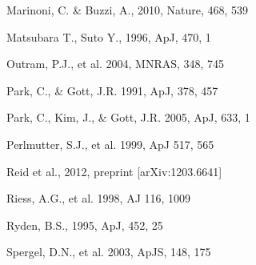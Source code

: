 \documentclass{emulateapj}
\begin{document}
\begin{thebibliography}{}
Marinoni, C. \& Buzzi, A., 2010, Nature, 468, 539

Matsubara T., Suto Y., 1996, ApJ, 470, 1

Outram, P.J., et al. 2004, MNRAS, 348, 745

Park, C., \& Gott, J.R. 1991, ApJ, 378, 457

Park, C., Kim, J., \& Gott, J.R. 2005, ApJ, 633, 1

Perlmutter, S.J., et al. 1999, ApJ 517, 565

Reid et al., 2012, preprint [arXiv:1203.6641]

Riess, A.G., et al. 1998, AJ 116, 1009

Ryden, B.S., 1995, ApJ, 452, 25

Spergel, D.N., et al. 2003, ApJS, 148, 175

\end{thebibliography}

\clearpage


\clearpage

\clearpage
\end{document}
